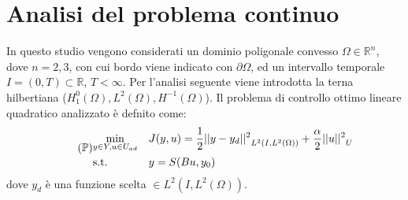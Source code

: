 \section{Analisi del problema continuo}
\label{chap:Continuos}

In questo studio vengono considerati un dominio poligonale convesso $\Omega \in \mathbb{R}^n$, dove $n=2,3$, con cui bordo viene indicato con $\partial\Omega$, ed un intervallo temporale $I = (0,T) \subset \mathbb{R}$, $T < \infty$. 
Per l'analisi seguente viene introdotta la terna hilbertiana (${H^{0}_{1}(\Omega)},{L^{2}(\Omega)},{H^{-1}(\Omega)}$).
Il problema di controllo ottimo lineare quadratico analizzato è defnito come:
{\renewcommand\arraystretch{2}
\begin{equation}
\tag{$\mathbb{P}$}
\begin{aligned}
& \underset{y \in Y, u \in U_{ad}}{\text{min}}
& & J(y,u) = \frac{1}{2}{||y-y_d||^{2}}_{L^2(I,{L^{2}(\Omega)})} + \frac{\alpha}{2}{||u||^{2}}_U \\
& \text{s.t.} & & y = S(Bu,y_0) \\
\label{eq:200}
\end{aligned}
\end{equation}
} %
dove $y_d$ è una funzione scelta $\in L^2(I,{L^{2}(\Omega)})$.


